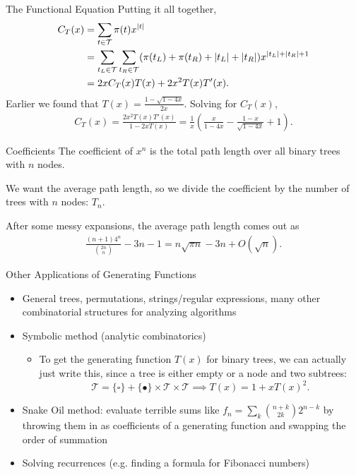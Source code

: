 \documentclass[aspectratio=169]{beamer}
\newcommand{\TT}{\mathcal{T}}
\begin{document}
\begin{frame}{The Functional Equation}
  Putting it all together,
  \begin{align*}
    C_T(x) &= \sum_{t \in \TT} \pi(t) x^{\abs{t}} \\
    &= \sum_{t_L \in \TT} \sum_{t_R \in \TT} (\pi(t_L) + \pi(t_R) + \abs{t_L} + \abs{t_R}) x^{\abs{t_L} + \abs{t_R} + 1} \\
    &= 2x C_T(x) T(x) + 2x^2 T(x) T'(x).
  \end{align*} \pause
  Earlier we found that $T(x) = \displaystyle \frac{1 - \sqrt{1-4x}}{2x}$.
  Solving for $C_T(x)$,
  \begin{align*}
    C_T(x) = \frac{2x^2 T(x) T'(x)}{1 - 2x T(x)}
    = \frac{1}{x} \left( \frac{x}{1 - 4x} - \frac{1 - x}{\sqrt{1 - 4x}} + 1 \right).
  \end{align*}
\end{frame}

\begin{frame}{Coefficients}
  The coefficient of $x^n$ is the total path length over all binary trees with $n$ nodes.

  We want the average path length, so we divide the coefficient by the number of trees with $n$ nodes: $T_n$. \pause

  After some messy expansions, the average path length comes out as
  \begin{align*}
    \frac{(n+1) 4^n}{\binom{2n}{n}} - 3n - 1 = n \sqrt{\pi n} - 3n + O(\sqrt{n}).
  \end{align*}

\end{frame}

\begin{frame}{Other Applications of Generating Functions}
  \begin{itemize}
    \item General trees, permutations, strings/regular expressions, many other combinatorial structures
    for analyzing algorithms \pause
    \item Symbolic method (analytic combinatorics) \pause
    \begin{itemize}
      \item To get the generating function $T(x)$ for binary trees, we can actually just write this, since a tree is either empty or a node and two subtrees:
      \[
      \TT = \{ \square \} + \{ \bullet \} \times \TT \times \TT
      \implies T(x) = 1 + xT(x)^2.\]
    \end{itemize} \pause
    \item Snake Oil method: evaluate terrible sums like
    $f_n = \displaystyle \sum_{k} \binom{n+k}{2k} 2^{n-k}$
    by throwing them in as coefficients of a generating function and swapping the order of summation \pause
    \item Solving recurrences (e.g. finding a formula for Fibonacci numbers)
  \end{itemize}
\end{frame}
\end{document}

